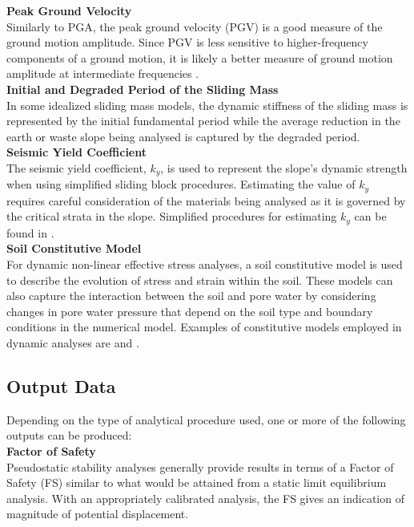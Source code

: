 \noindent\textbf{Peak Ground Velocity}\\
Similarly to PGA, the peak ground velocity (PGV) is a good measure of the ground motion amplitude. Since PGV is less sensitive to higher-frequency components of a ground motion, it is likely a better measure of ground motion amplitude at intermediate frequencies \citep{kramer1996geotechnical}.\\

\noindent\textbf{Initial and Degraded Period of the Sliding Mass}\\
In some idealized sliding mass models, the dynamic stiffness of the sliding mass is represented by the initial fundamental period while the average reduction in the earth or waste slope being analysed is captured by the degraded period.\\

\noindent\textbf{Seismic Yield Coefficient}\\
The seismic yield coefficient, $k_y$, is used to represent the slope's dynamic strength when using simplified sliding block procedures. Estimating the value of $k_y$ requires careful consideration of the materials being analysed as it is governed by the critical strata in the slope. Simplified procedures for estimating $k_y$ can be found in \cite{bray1998simplified}.\\ 

\noindent\textbf{Soil Constitutive Model}\\
For dynamic non-linear effective stress analyses, a soil constitutive model is used to describe the evolution of stress and strain within the soil. These models can also capture the interaction between the soil and pore water by considering changes in pore water pressure that depend on the soil type and boundary conditions in the numerical model. Examples of constitutive models employed in dynamic analyses are \cite{yang2003computational, byrne2004numerical, boulanger2017pm4sand} and \cite{boulanger2018pm4silt}.

\subsection{Output Data}
\label{subsec:eq_landslide_output}
Depending on the type of analytical procedure used, one or more of the following outputs can be produced:\\[0.5em]

\noindent\textbf{Factor of Safety}\\
Pseudostatic stability analyses generally provide results in terms of a Factor of Safety (FS) similar to what would be attained from a static limit equilibrium analysis. With an appropriately calibrated analysis, the FS gives an indication of magnitude of potential displacement.\\

